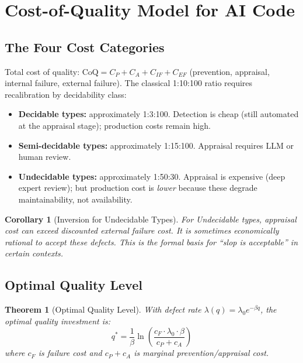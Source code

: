 \documentclass[11pt, a4paper, copyright]{googledeepmind}
\newtheorem{theorem}{Theorem}[section]
\newtheorem{corollary}{Corollary}[section]
\newcommand{\CoQ}{\mathrm{CoQ}}
\begin{document}
\section{Cost-of-Quality Model for AI Code}
\label{sec:coq}

\subsection{The Four Cost Categories}

Total cost of quality: $\CoQ = C_P + C_A + C_{IF} + C_{EF}$ (prevention, appraisal, internal failure, external failure). The classical 1:10:100 ratio requires recalibration by decidability class:

\begin{itemize}
\item \textbf{Decidable types:} approximately 1:3:100. Detection is cheap (still automated at the appraisal stage); production costs remain high.
\item \textbf{Semi-decidable types:} approximately 1:15:100. Appraisal requires LLM or human review.
\item \textbf{Undecidable types:} approximately 1:50:30. Appraisal is expensive (deep expert review); but production cost is \emph{lower} because these degrade maintainability, not availability.
\end{itemize}

\begin{corollary}[Inversion for Undecidable Types]
For Undecidable types, appraisal cost can exceed discounted external failure cost. It is sometimes economically rational to \emph{accept} these defects. This is the formal basis for ``slop is acceptable'' in certain contexts.
\end{corollary}

\subsection{Optimal Quality Level}

\begin{theorem}[Optimal Quality Level]
\label{thm:optquality}
With defect rate $\lambda(q) = \lambda_0 e^{-\beta q}$, the optimal quality investment is:
\begin{equation}
q^* = \frac{1}{\beta} \ln\!\left(\frac{c_F \cdot \lambda_0 \cdot \beta}{c_P + c_A}\right)
\end{equation}
where $c_F$ is failure cost and $c_P + c_A$ is marginal prevention/appraisal cost.
\end{theorem}
\end{document}
